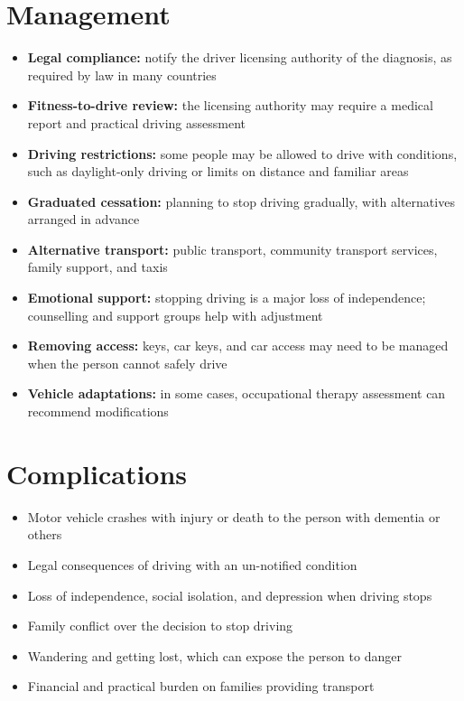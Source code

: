 \section*{Management}
\begin{itemize}
    \item \textbf{Legal compliance:} notify the driver licensing authority of the diagnosis, as required by law in many countries
    \item \textbf{Fitness-to-drive review:} the licensing authority may require a medical report and practical driving assessment
    \item \textbf{Driving restrictions:} some people may be allowed to drive with conditions, such as daylight-only driving or limits on distance and familiar areas
    \item \textbf{Graduated cessation:} planning to stop driving gradually, with alternatives arranged in advance
    \item \textbf{Alternative transport:} public transport, community transport services, family support, and taxis
    \item \textbf{Emotional support:} stopping driving is a major loss of independence; counselling and support groups help with adjustment
    \item \textbf{Removing access:} keys, car keys, and car access may need to be managed when the person cannot safely drive
    \item \textbf{Vehicle adaptations:} in some cases, occupational therapy assessment can recommend modifications
\end{itemize}

\section*{Complications}
\begin{itemize}
    \item Motor vehicle crashes with injury or death to the person with dementia or others
    \item Legal consequences of driving with an un-notified condition
    \item Loss of independence, social isolation, and depression when driving stops
    \item Family conflict over the decision to stop driving
    \item Wandering and getting lost, which can expose the person to danger
    \item Financial and practical burden on families providing transport
\end{itemize}

